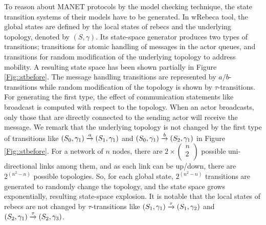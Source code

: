 To reason about MANET protocols by the model checking technique, the state transition systems of their models have to be generated. In wRebeca tool, the global states are defined by the local states of rebecs and the underlying topology, denoted by $(S,\gamma)$. Its state-space generator produces two types of transitions; transitions for atomic handling of messages in the actor queues, and transitions for random modification of the underlying topology to address mobility. A resulting state space has been shown partially in Figure \ref{Fig::stbefore}. The message handling transitions are represented by $a/b$-transitions while random modification of the topology is shown by $\tau$-transitions. %
For generating the first type, the effect of communication statements like broadcast is computed with respect to the topology. When an actor broadcasts, only those that are directly connected to the sending actor will receive the message. We remark that the underlying topology is not changed by the first type of transitions like $(S_0,\gamma_1)\overto{a}(S_1,\gamma_1)$  and $(S_0,\gamma_1)\overto{b}(S_2,\gamma_1)$ in Figure \ref{Fig::stbefore}. For a network of $n$ nodes, there are $2\times \begin{pmatrix}
n \\
2 \\
\end{pmatrix}$ possible uni-directional links among them, and as each link can be up/down, there are $2^{(n^2-n)}$ possible topologies. So, for each global state, $2^{(n^2-n)}$ transitions are generated to randomly change the topology, and the state space grows exponentially, resulting state-space explosion. It is notable that the local states of rebecs are not changed by $\tau$-transitions like $(S_1,\gamma_1)\overto{\tau}(S_1,\gamma_2)$ and $(S_2,\gamma_1)\overto{\tau}(S_2,\gamma_3)$.

